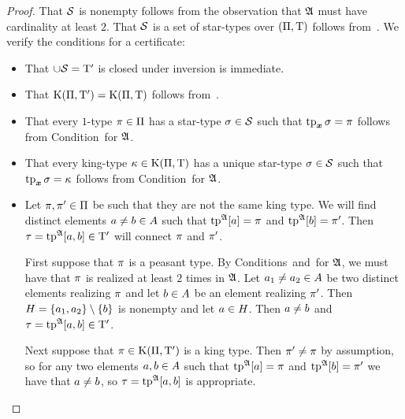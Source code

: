 \begin{proof}
That $\mathcal{S}$ is nonempty follows from the observation that $\mathfrak{A}$ must have
cardinality at least $2$. That $\mathcal{S}$ is a set of star-types over
$(\Pi,\mathrm{T})$ follows from~.
We verify the conditions for a certificate:
\begin{itemize}
  \item[\refcondcerti] 
  That $\cup\mathcal{S} = {\mathrm{T}'}$ is closed under inversion is immediate.
  \item[\refcondcertK]
  That $\mathrm{K}(\Pi,{\mathrm{T}'}) = \mathrm{K}(\Pi,\mathrm{T})$ follows
  from~.
  \item[\refcondcertp]
  That every $1$-type $\pi \in \Pi$ has a star-type $\sigma \in \mathcal{S}$ such
  that $\operatorname{tp}_{\bm{x}}\sigma = \pi$ follows from Condition~ for $\mathfrak{A}$.
  \item[\refcondcertk]
  That every king-type $\kappa \in \mathrm{K}(\Pi,\mathrm{T})$ has a unique star-type
  $\sigma \in \mathcal{S}$ such that $\operatorname{tp}_{\bm{x}}\sigma = \kappa$ follows from
  Condition~ for $\mathfrak{A}$.
  \item[\refcondcertc]
  Let $\pi, {\pi'} \in \Pi$ be such that they are not the same king type.
  We will find distinct elements $a \neq b \in A$ such that
  $\operatorname{tp}^{\mathfrak{A}}[a] = \pi$ and $\operatorname{tp}^{\mathfrak{A}}[b] = {\pi'}$. Then $\tau =
  \operatorname{tp}^{\mathfrak{A}}[a,b] \in {\mathrm{T}'}$ will connect $\pi$ and ${\pi'}$.
  
  First suppose that $\pi$ is a peasant type. By
  Conditions~ and~ for $\mathfrak{A}$, we must have that
  $\pi$ is realized at least $2$ times in $\mathfrak{A}$. Let $a_1 \neq a_2 \in
  A$ be two distinct elements realizing $\pi$ and let $b \in A$ be
  an element realizing ${\pi'}$. Then $H = \left\{a_1,a_2\right\} \setminus \left\{b\right\}$ is
  nonempty and let $a \in H$. Then $a \neq b$ and $\tau =
  \operatorname{tp}^{\mathfrak{A}}[a,b] \in {\mathrm{T}'}$.
  
  Next suppose that $\pi \in \mathrm{K}(\Pi,{\mathrm{T}'})$ is a king type. Then ${\pi'}
  \neq \pi$ by assumption, so for any two elements $a, b \in A$ such
  that $\operatorname{tp}^{\mathfrak{A}}[a] = \pi$ and $\operatorname{tp}^{\mathfrak{A}}[b] = {\pi'}$ we have that $a
  \neq b$, so $\tau = \operatorname{tp}^{\mathfrak{A}}[a,b]$ is appropriate.
\end{itemize}
\end{proof}

